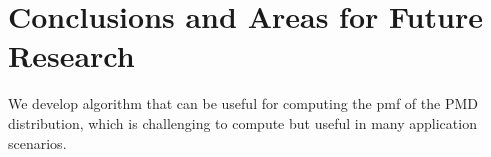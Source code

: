 \documentclass[12pt]{article}
\begin{document}
\section{Conclusions and Areas for Future Research}

We develop algorithm that can be useful for computing the pmf of the PMD distribution, which is challenging to compute but useful in many application scenarios.





	


%



	
\end{document}
